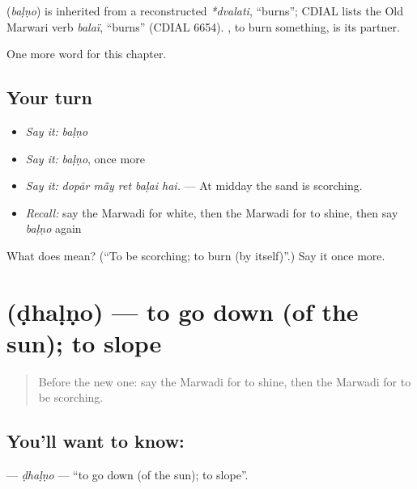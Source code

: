 \begin{cousinweb}
\textbf{} (\emph{baḷṇo}) is inherited from a reconstructed \emph{*dvalati}, \textquotedblleft{}burns\textquotedblright{}; CDIAL lists the Old Marwari verb \emph{balaï}, \textquotedblleft{}burns\textquotedblright{} (CDIAL 6654). \textbf{}, to burn something, is its partner.
\end{cousinweb}

\begin{grammarlens}[title={What you've built}]
One more word for this chapter.
\end{grammarlens}

\subsection*{Your turn}
\begin{itemize}
\raggedright
  \item \emph{Say it:} \emph{baḷṇo}
  \item \emph{Say it:} \emph{baḷṇo}, once more
  \item \emph{Say it:} \emph{dopār mā̃y ret baḷai hai.} — At midday the sand is scorching.
  \item \emph{Recall:} say the Marwadi for white, then the Marwadi for to shine, then say \emph{baḷṇo} again
\end{itemize}

\begin{tcolorbox}[breakable,colback=teal!4,colframe=teal!35!black,title={Before you move on}]
What does  mean? (\textquotedblleft{}To be scorching; to burn (by itself)\textquotedblright{}.) Say it once more.
\end{tcolorbox}
\section[\texorpdfstring{\mw{ढळणो} (ḍhaḷṇo)}{ढळणो (ḍhaḷṇo)}]{ (ḍhaḷṇo) — to go down (of the sun); to slope}

\label{lesson:MW-C230-dhalno}



\begin{quote}
Before the new one: say the Marwadi for to shine, then the Marwadi for to be scorching.
\end{quote}

\subsection*{You'll want to know: }
\textbf{} — \emph{ḍhaḷṇo} — \textquotedblleft{}to go down (of the sun); to slope\textquotedblright{}.

